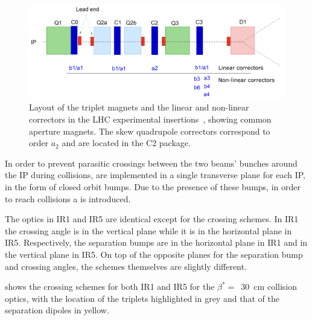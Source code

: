 \begin{figure}[!hbt]
  \centering
  \includegraphics*[width=\linewidth]{Figures/Optics_Measurements_Corrections_at_LHC/corrector_package.png}
  \caption{Layout of the triplet magnets and the linear and non-linear correctors in the LHC experimental insertions~\cite{CERN:Bruning:Dynap_Studies}, showing common aperture magnets. The skew quadrupole correctors correspond to order \(a_2\) and are located in the \textcolor{mplb}{C\num{2}} package.}
  \label{figure:lhc_ir_corrector_layout}
\end{figure}

In order to prevent parasitic crossings between the two beams' bunches around the IP during collisions,  are implemented in a single transverse plane for each IP, in the form of closed orbit bumps.
Due to the presence of these bumps, in order to reach collisions a  is introduced.

The optics in IR\num{1} and IR\num{5} are identical except for the crossing schemes.
In IR\num{1} the crossing angle is in the vertical plane while it is in the horizontal plane in IR\num{5}.
Respectively, the separation bumps are in the horizontal plane in IR\num{1} and in the vertical plane in IR\num{5}.
On top of the opposite planes for the separation bump and crossing angles, the schemes themselves are slightly different.

 shows the crossing schemes for both IR\num{1} and IR\num{5} for the \(\beta^{\ast} =\)~\qty{30}{\centi\metre} collision optics, with the location of the triplets highlighted in grey and that of the separation dipoles in yellow.

